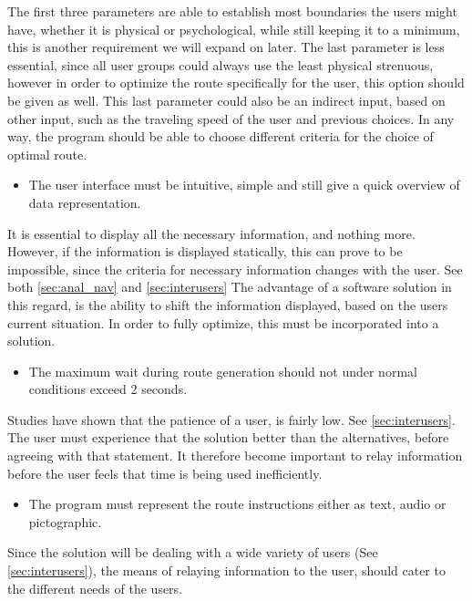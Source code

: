 The first three parameters are able to establish most boundaries the users might have, whether it is physical or psychological, while still keeping it to a minimum, this is another requirement we will expand on later. The last parameter is less essential, since all user groups could always use the least physical strenuous, however in order to optimize the route specifically for the user, this option should be given as well. This last parameter could also be an indirect input, based on other input, such as the traveling speed of the user and previous choices. In any way, the program should be able to choose different criteria for the choice of optimal route.

\begin{itemize}
	\item The user interface must be intuitive, simple and still give a quick overview of data representation.
\end{itemize}

It is essential to display all the necessary information, and nothing more. However, if the information is displayed statically, this can prove to be impossible, since the criteria for necessary information changes with the user. See both \cref{sec:anal_nav} and \cref{sec:interusers} The advantage of a software solution in this regard, is the ability to shift the information displayed, based on the users current situation. In order to fully optimize, this must be incorporated into a solution.

\begin{itemize}
	\item The maximum wait during route generation should not under normal conditions exceed 2 seconds.\label{irm_tid}
\end{itemize}

Studies have shown that the patience of a user, is fairly low. See \cref{sec:interusers}. The user must experience that the solution better than the alternatives, before agreeing with that statement. It therefore become important to relay information before the user feels that time is being used inefficiently.

\begin{itemize}
	\item The program must represent the route instructions either as text, audio or pictographic.
\end{itemize}

Since the solution will be dealing with a wide variety of users (See \cref{sec:interusers}), the means of relaying information to the user, should cater to the different needs of the users.


